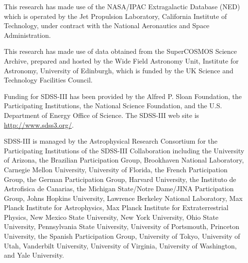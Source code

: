 \documentclass[11pt,a4paper]{article}
\begin{document}
This research has made use of the NASA/IPAC Extragalactic Database
(NED) which is operated by the Jet Propulsion Laboratory, California
Institute of Technology, under contract with the National Aeronautics
and Space Administration.

This research has made use of data obtained from the SuperCOSMOS
Science Archive, prepared and hosted by the Wide Field Astronomy Unit,
Institute for Astronomy, University of Edinburgh, which is funded by
the UK Science and Technology Facilities Council.

Funding for SDSS-III has been provided by the Alfred P. Sloan
Foundation, the Participating Institutions, the National Science
Foundation, and the U.S. Department of Energy Office of Science. The
SDSS-III web site is
\href{http://www.sdss3.org/}{http://www.sdss3.org/}.

SDSS-III is managed by the Astrophysical Research Consortium for the
Participating Institutions of the SDSS-III Collaboration including the
University of Arizona, the Brazilian Participation Group, Brookhaven
National Laboratory, Carnegie Mellon University, University of
Florida, the French Participation Group, the German Participation
Group, Harvard University, the Instituto de Astrofisica de Canarias,
the Michigan State/Notre Dame/JINA Participation Group, Johns Hopkins
University, Lawrence Berkeley National Laboratory, Max Planck
Institute for Astrophysics, Max Planck Institute for Extraterrestrial
Physics, New Mexico State University, New York University, Ohio State
University, Pennsylvania State University, University of Portsmouth,
Princeton University, the Spanish Participation Group, University of
Tokyo, University of Utah, Vanderbilt University, University of
Virginia, University of Washington, and Yale University.






\end{document}
